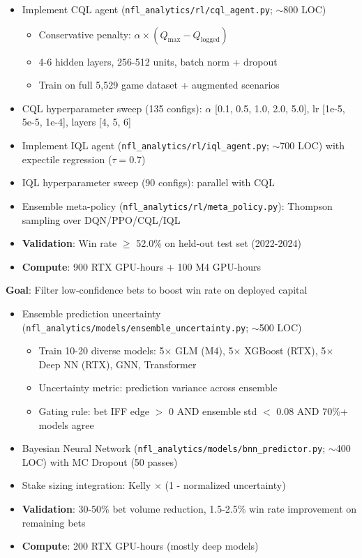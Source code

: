 \begin{itemize}
  \item {} Implement CQL agent (\texttt{nfl\_analytics/rl/cql\_agent.py}; $\sim$800 LOC)
  \begin{itemize}
    \item Conservative penalty: $\alpha \times (Q_{\max} - Q_{\text{logged}})$
    \item 4-6 hidden layers, 256-512 units, batch norm + dropout
    \item Train on full 5,529 game dataset + augmented scenarios
  \end{itemize}
  \item {} CQL hyperparameter sweep (135 configs): $\alpha$ [0.1, 0.5, 1.0, 2.0, 5.0], lr [1e-5, 5e-5, 1e-4], layers [4, 5, 6]
  \item {} Implement IQL agent (\texttt{nfl\_analytics/rl/iql\_agent.py}; $\sim$700 LOC) with expectile regression ($\tau=0.7$)
  \item {} IQL hyperparameter sweep (90 configs): parallel with CQL
  \item {} Ensemble meta-policy (\texttt{nfl\_analytics/rl/meta\_policy.py}): Thompson sampling over DQN/PPO/CQL/IQL
  \item {} \textbf{Validation}: Win rate $\ge$ 52.0\% on held-out test set (2022-2024)
  \item \textbf{Compute}: 900 RTX GPU-hours + 100 M4 GPU-hours
\end{itemize}

\textbf{Goal}: Filter low-confidence bets to boost win rate on deployed capital

\begin{itemize}
  \item {} Ensemble prediction uncertainty (\texttt{nfl\_analytics/models/ensemble\_uncertainty.py}; $\sim$500 LOC)
  \begin{itemize}
    \item Train 10-20 diverse models: 5$\times$ GLM (M4), 5$\times$ XGBoost (RTX), 5$\times$ Deep NN (RTX), GNN, Transformer
    \item Uncertainty metric: prediction variance across ensemble
    \item Gating rule: bet IFF edge $>$ 0 AND ensemble std $<$ 0.08 AND 70\%+ models agree
  \end{itemize}
  \item {} Bayesian Neural Network (\texttt{nfl\_analytics/models/bnn\_predictor.py}; $\sim$400 LOC) with MC Dropout (50 passes)
  \item {} Stake sizing integration: Kelly $\times$ (1 - normalized uncertainty)
  \item {} \textbf{Validation}: 30-50\% bet volume reduction, 1.5-2.5\% win rate improvement on remaining bets
  \item \textbf{Compute}: 200 RTX GPU-hours (mostly deep models)
\end{itemize}

